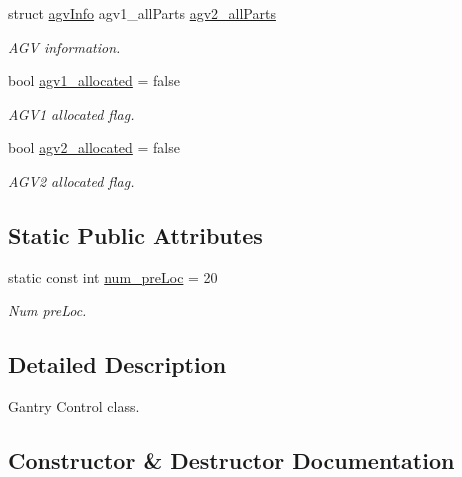 \begin{DoxyCompactItemize}
struct \hyperlink{structagvInfo}{agv\+Info} agv1\+\_\+all\+Parts \hyperlink{classGantryControl_a79ac55bacfc11034d9fdd83920b3871d}{agv2\+\_\+all\+Parts}
\begin{DoxyCompactList}\small\item\em A\+GV information. \end{DoxyCompactList}\item 
\mbox{\label{classGantryControl_a568d5391ab16be3d57db4f48379dcaa6}} 
bool \hyperlink{classGantryControl_a568d5391ab16be3d57db4f48379dcaa6}{agv1\+\_\+allocated} = false
\begin{DoxyCompactList}\small\item\em A\+G\+V1 allocated flag. \end{DoxyCompactList}\item 
\mbox{\label{classGantryControl_afde665598b615a44b753bb2208d11afc}} 
bool \hyperlink{classGantryControl_afde665598b615a44b753bb2208d11afc}{agv2\+\_\+allocated} = false
\begin{DoxyCompactList}\small\item\em A\+G\+V2 allocated flag. \end{DoxyCompactList}\end{DoxyCompactItemize}
\subsection*{Static Public Attributes}
\begin{DoxyCompactItemize}
\item 
\mbox{\label{classGantryControl_abea9b6d47cfab1e5e6761206c5d32770}} 
static const int \hyperlink{classGantryControl_abea9b6d47cfab1e5e6761206c5d32770}{num\+\_\+pre\+Loc} = 20
\begin{DoxyCompactList}\small\item\em Num pre\+Loc. \end{DoxyCompactList}\end{DoxyCompactItemize}


\subsection{Detailed Description}
Gantry Control class. 

\subsection{Constructor \& Destructor Documentation}
\mbox{\label{classGantryControl_a9b8ad2f8dda14130976eb5d9634acbae}} 
